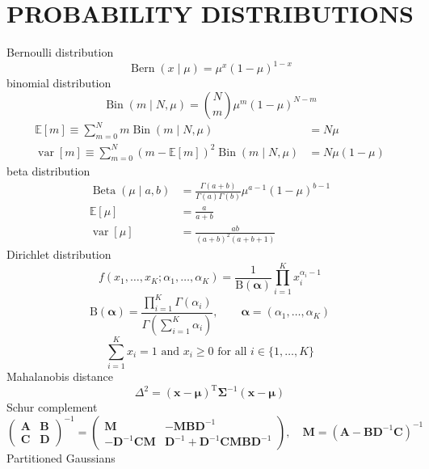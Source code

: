 \documentclass{article}
\begin{document}
	\section{PROBABILITY DISTRIBUTIONS}
	Bernoulli distribution
	$$
	\operatorname{Bern}(x \mid \mu)=\mu^{x}(1-\mu)^{1-x}
	$$
	binomial distribution
	$$
	\operatorname{Bin}(m \mid N, \mu)=\binom{N}{m} \mu^{m}(1-\mu)^{N-m}
	$$
	$$
	\begin{aligned}
	\mathbb{E}[m] \equiv \sum_{m=0}^{N} m \operatorname{Bin}(m \mid N, \mu) &=N \mu \\
	\operatorname{var}[m] \equiv \sum_{m=0}^{N}(m-\mathbb{E}[m])^{2} \operatorname{Bin}(m \mid N, \mu) &=N \mu(1-\mu)
	\end{aligned}
	$$
	beta distribution
	$$
	\begin{aligned}
	\operatorname{Beta}(\mu \mid a, b) &=\frac{\Gamma(a+b)}{\Gamma(a) \Gamma(b)} \mu^{a-1}(1-\mu)^{b-1}\\
	\mathbb{E}[\mu] &=\frac{a}{a+b} \\
	\operatorname{var}[\mu] &=\frac{a b}{(a+b)^{2}(a+b+1)}
	\end{aligned}
	$$
	Dirichlet distribution
	$$
	{\displaystyle f\left(x_{1},\ldots ,x_{K};\alpha _{1},\ldots ,\alpha _{K}\right)={\frac {1}{\mathrm {B} ({\boldsymbol {\alpha }})}}\prod _{i=1}^{K}x_{i}^{\alpha _{i}-1}}
	$$
	$$
	{\displaystyle \mathrm {B} ({\boldsymbol {\alpha }})={\frac {\prod \limits _{i=1}^{K}\Gamma (\alpha _{i})}{\Gamma \left(\sum \limits _{i=1}^{K}\alpha _{i}\right)}},\qquad {\boldsymbol {\alpha }}=(\alpha _{1},\ldots ,\alpha _{K})}
	$$
	$$
	{\displaystyle \sum _{i=1}^{K}x_{i}=1{\mbox{ and }}x_{i}\geq 0{\mbox{ for all }}i\in \{1,\dots ,K\}}
	$$
	Mahalanobis distance
	$$
	\Delta^{2}=(\mathbf{x}-\boldsymbol{\mu})^{\mathrm{T}} \boldsymbol{\Sigma}^{-1}(\mathbf{x}-\boldsymbol{\mu})
	$$
	Schur complement
	$$
	\left(\begin{array}{ll}
	\mathbf{A} & \mathbf{B} \\
	\mathbf{C} & \mathbf{D}
	\end{array}\right)^{-1}=\left(\begin{array}{cc}
	\mathbf{M} & -\mathbf{M B D}^{-1} \\
	-\mathbf{D}^{-1} \mathbf{C M} & \mathbf{D}^{-1}+\mathbf{D}^{-1} \mathbf{C M B D}^{-1} 
	\end{array}\right),\quad
	\mathbf{M}=\left(\mathbf{A}-\mathbf{B D}^{-1} \mathbf{C}\right)^{-1}
	$$
	Partitioned Gaussians
\end{document}
